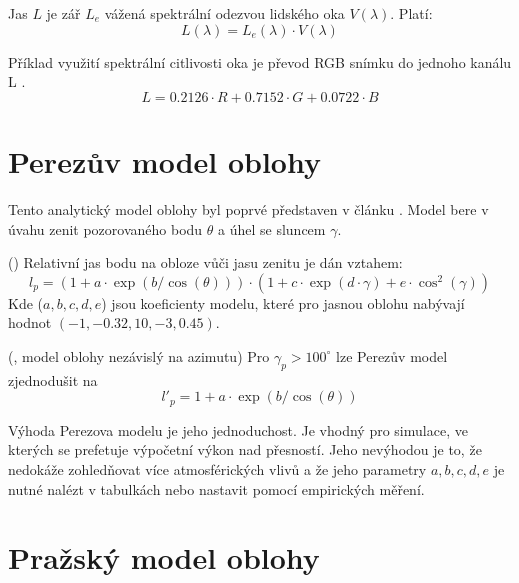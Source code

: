 \begin{definice}
  Jas $L$ je zář $L_e$ vážená spektrální odezvou lidského oka $V(\lambda)$. Platí:
  \begin{equation}
    L(\lambda) = L_e(\lambda) \cdot V(\lambda)
  \end{equation}
\end{definice}

Příklad využití spektrální citlivosti oka je převod RGB snímku do jednoho kanálu L \citep{rgbgray}.
\begin{equation}
  L = 0.2126 \cdot R + 0.7152 \cdot G + 0.0722 \cdot B 
\end{equation}

\section{Perezův model oblohy}
Tento analytický model oblohy byl poprvé představen v článku \cite{Perez93}.
Model bere v úvahu zenit pozorovaného bodu $\theta$ a úhel se sluncem $\gamma$.

\begin{veta}\label{veta01:1}(\citealp{Perez93})
Relativní jas bodu na obloze vůči jasu zenitu je dán vztahem:
\begin{equation}\label{eq01:5}
  l_p = (1 + a \cdot \exp(b/\cos(\theta))) \cdot (1 + c \cdot \exp(d \cdot \gamma) + e \cdot \cos^2(\gamma))
\end{equation}
    Kde ($a, b, c, d, e$) jsou koeficienty modelu, které pro jasnou oblohu nabývají hodnot $(-1, -0.32, 10, -3, 0.45)$.
\end{veta}

\begin{veta}\label{veta01:2}(\citealp{Lalonde10}, model oblohy nezávislý na azimutu)
  Pro $\gamma_p>100^\circ$ lze Perezův model zjednodušit na
  \begin{equation}\label{eq01:5}
  l'_p = 1 + a \cdot \exp(b/\cos(\theta))
  \end{equation}
  \end{veta}

Výhoda Perezova modelu je jeho jednoduchost. Je vhodný pro simulace, ve kterých se prefetuje výpočetní výkon nad přesností. Jeho nevýhodou je to, že nedokáže zohledňovat více atmosférických vlivů a že jeho parametry $a, b, c, d, e$ je nutné nalézt v tabulkách nebo nastavit pomocí empirických měření.

\section{Pražský model oblohy}

